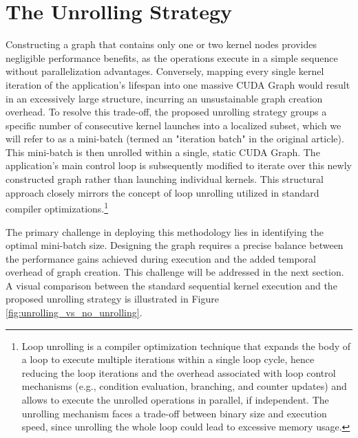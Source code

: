 \documentclass[10pt,twocolumn]{article}
\begin{document}
\section{The Unrolling Strategy}
Constructing a graph that contains only one or two kernel nodes provides negligible performance benefits, as the operations execute in a simple sequence without parallelization advantages. 
Conversely, mapping every single kernel iteration of the application's lifespan into one massive CUDA Graph would result in an excessively large structure, incurring an unsustainable graph creation overhead.
To resolve this trade-off, the proposed unrolling strategy groups a specific number of consecutive kernel launches into a localized subset, which we will refer to as a mini-batch (termed an "iteration batch" in the original article). This mini-batch is then unrolled within a single, static CUDA Graph. The application's main control loop is subsequently modified to iterate over this newly constructed graph rather than launching individual kernels. This structural approach closely mirrors the concept of loop unrolling utilized in standard compiler optimizations.\footnote{Loop unrolling is a compiler optimization technique that expands the body of a loop to execute multiple iterations within a single loop cycle, hence reducing the loop iterations and the overhead associated with loop control mechanisms (e.g., condition evaluation, branching, and counter updates) and allows to execute the unrolled operations in parallel, if independent. The unrolling mechanism faces a trade-off between binary size and execution speed, since unrolling the whole loop could lead to excessive memory usage.}

The primary challenge in deploying this methodology lies in identifying the optimal mini-batch size. Designing the graph requires a precise balance between the performance gains achieved during execution and the added temporal overhead of graph creation. 
This challenge will be addressed in the next section. A visual comparison between the standard sequential kernel execution and the proposed unrolling strategy is illustrated in Figure \ref{fig:unrolling_vs_no_unrolling}.
\end{document}
